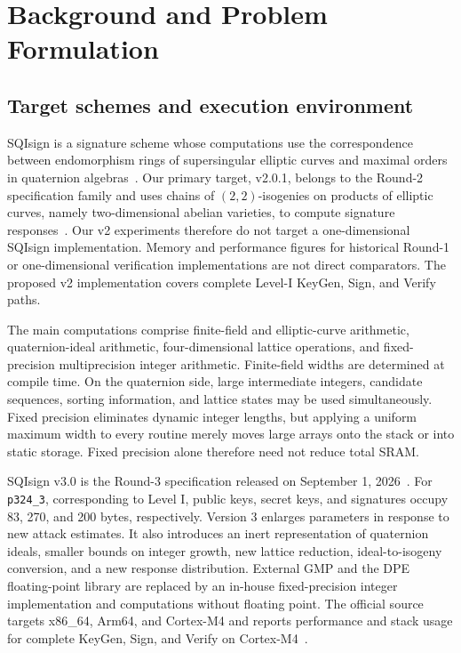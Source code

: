 \documentclass[a4paper,10pt]{article}
\theoremstyle{definition}
\theoremstyle{remark}
\begin{document}
\section{Background and Problem Formulation}
\label{sec:background}

\subsection{Target schemes and execution environment}

SQIsign is a signature scheme whose computations use the correspondence between endomorphism rings of supersingular elliptic curves and maximal orders in quaternion algebras~\cite{sqisign-2020}. Our primary target, v2.0.1, belongs to the Round-2 specification family and uses chains of $(2,2)$-isogenies on products of elliptic curves, namely two-dimensional abelian varieties, to compute signature responses~\cite{sqisign-spec-v201}. Our v2 experiments therefore do not target a one-dimensional SQIsign implementation. Memory and performance figures for historical Round-1 or one-dimensional verification implementations are not direct comparators. The proposed v2 implementation covers complete Level-I KeyGen, Sign, and Verify paths.

The main computations comprise finite-field and elliptic-curve arithmetic, quaternion-ideal arithmetic, four-dimensional lattice operations, and fixed-precision multiprecision integer arithmetic. Finite-field widths are determined at compile time. On the quaternion side, large intermediate integers, candidate sequences, sorting information, and lattice states may be used simultaneously. Fixed precision eliminates dynamic integer lengths, but applying a uniform maximum width to every routine merely moves large arrays onto the stack or into static storage. Fixed precision alone therefore need not reduce total SRAM.

SQIsign v3.0 is the Round-3 specification released on September 1, 2026~\cite{sqisign-spec-v3}. For \texttt{p324\_3}, corresponding to Level I, public keys, secret keys, and signatures occupy 83, 270, and 200 bytes, respectively. Version 3 enlarges parameters in response to new attack estimates. It also introduces an inert representation of quaternion ideals, smaller bounds on integer growth, new lattice reduction, ideal-to-isogeny conversion, and a new response distribution. External GMP and the DPE floating-point library are replaced by an in-house fixed-precision integer implementation and computations without floating point. The official source targets x86\_64, Arm64, and Cortex-M4 and reports performance and stack usage for complete KeyGen, Sign, and Verify on Cortex-M4~\cite{sqisign-spec-v3,sqisign-code-v3}.
\end{document}
